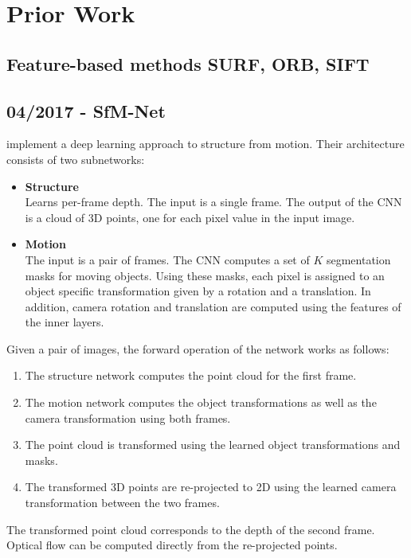 \chapter{Prior Work}

	
	
	
	\section{Feature-based methods SURF, ORB, SIFT}
	
	\section{04/2017 - SfM-Net}

		\cite{SFMNET} implement a deep learning approach to structure from motion. 
		Their architecture consists of two subnetworks:
		\begin{itemize}
			\item \textbf{Structure}
				\\
				Learns per-frame depth.
				The input is a single frame. 
				The output of the CNN is a cloud of 3D points, one for each pixel value in the input image.
			\item \textbf{Motion}
				\\
				The input is a pair of frames.
				The CNN computes a set of $K$ segmentation masks for moving objects. 
				Using these masks, each pixel is assigned to an object specific transformation given by a rotation and a translation.
				In addition, camera rotation and translation are computed using the features of the inner layers.
		\end{itemize}
		Given a pair of images, the forward operation of the network works as follows:
		\begin{enumerate}
			\item The structure network computes the point cloud for the first frame.
			\item The motion network computes the object transformations as well as the camera transformation using both frames.
			\item The point cloud is transformed using the learned object transformations and masks.
			\item The transformed 3D points are re-projected to 2D using the learned camera transformation between the two frames.
		\end{enumerate}
		The transformed point cloud corresponds to the depth of the second frame.
		Optical flow can be computed directly from the re-projected points.
		
